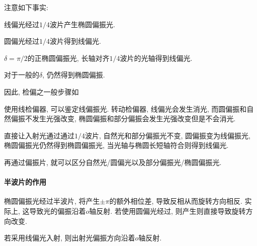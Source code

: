 \documentclass{ctexart}
\begin{document}
注意如下事实:
\begin{cenum}
    \item 线偏光经过$1/4$波片产生椭圆偏振光.
    \item 圆偏光经过$1/4$波片得到线偏光.
    \item $\delta = \pi/2$的正椭圆偏振光, 长轴对齐$1/4$波片的光轴得到线偏光.
    \item 对于一般的$\delta$, 仍然得到椭圆偏振.
\end{cenum}
因此, 检偏之一般步骤如
\begin{cenum}
    \item 使用线检偏器, 可以鉴定线偏振光. 转动检偏器, 线偏光会发生消光, 而圆偏振和自然偏振不发生光强改变, 椭圆偏振和部分偏振会发生光强改变但是不会消光.
    \item 直接让入射光通过通过$1/4$波片, 自然光和部分偏振光不变, 圆偏振变为线偏振光, 椭圆偏振光仍然得到椭圆偏振光, 当光轴与椭圆长短轴符合则得到线偏光.
    \item 再通过偏振片, 就可以区分自然光/圆偏光以及部分偏振光/椭圆偏振光.
\end{cenum}

\paragraph{半波片的作用} %
\label{par:半波片的作用}

椭圆偏振光经过半波片, 将产生$\pm \pi$的额外相位差, 导致反相从而旋转方向相反. 实际上, 这导致光的偏振沿着$o$轴反射. 若使用圆偏光经过, 则产生则直接导致旋转方向改变.
\par
若采用线偏光入射, 则出射光偏振方向沿着$o$轴反射.

\end{document}

